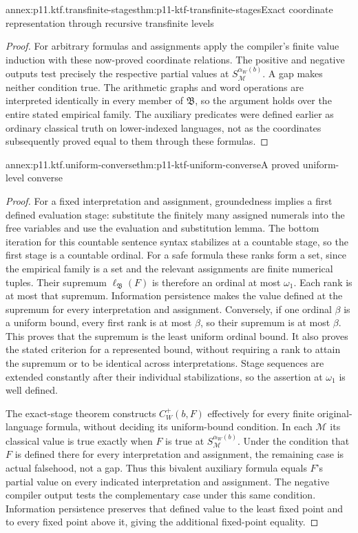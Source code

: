 \begin{annexitem}{annex:p11.ktf.transfinite-stages}{thm:p11-ktf-transfinite-stages}{Exact coordinate representation through recursive transfinite levels}
\begin{proof}
For arbitrary formulas and assignments apply the compiler's finite
value induction with these now-proved coordinate relations. The
positive and negative outputs test precisely the respective partial
values at \(S_{\mathcal M}^{\alpha_W(b)}\). A gap makes
neither condition true. The arithmetic graphs and word operations
are interpreted identically in every member of \(\mathfrak B\),
so the argument holds over the entire stated empirical family.
The auxiliary predicates were defined earlier as ordinary classical
truth on lower-indexed languages, not as the coordinates subsequently
proved equal to them through these formulas.
\end{proof}
\end{annexitem}

\begin{annexitem}{annex:p11.ktf.uniform-converse}{thm:p11-ktf-uniform-converse}{A proved uniform-level converse}
\begin{proof}
For a fixed interpretation and assignment, groundedness implies a
first defined evaluation stage: substitute the finitely many assigned
numerals into the free variables and use the evaluation and substitution
lemma. The bottom iteration for this countable sentence syntax stabilizes
at a countable stage, so the first stage is a countable ordinal.
For a safe formula these ranks form a set, since the empirical family
is a set and the relevant assignments are finite numerical tuples.
Their supremum \(\ell_{\mathfrak B}(F)\) is therefore an ordinal
at most \(\omega_1\). Each rank is at most that supremum.
Information persistence makes the value defined at the supremum for
every interpretation and assignment. Conversely, if one ordinal
\(\beta\) is a uniform bound, every first rank is at most
\(\beta\), so their supremum is at most \(\beta\).
This proves that the supremum is the least uniform ordinal bound.
It also proves the stated criterion for a represented bound, without
requiring a rank to attain the supremum or to be identical across
interpretations. Stage sequences are extended constantly after their
individual stabilizations, so the assertion at \(\omega_1\)
is well defined.

The exact-stage theorem constructs \(C_W^+(b,F)\) effectively
for every finite original-language formula, without deciding its
uniform-bound condition. In each \(\mathcal M\) its classical
value is true exactly when \(F\) is true at
\(S_{\mathcal M}^{\alpha_W(b)}\). Under the condition
that \(F\) is defined there for every interpretation and
assignment, the remaining case is actual falsehood, not a gap.
Thus this bivalent auxiliary formula equals \(F\)'s partial
value on every indicated interpretation and assignment. The negative
compiler output tests the complementary case under this same
condition. Information persistence preserves that defined value
to the least fixed point and to every fixed point above it,
giving the additional fixed-point equality.


\end{proof}
\end{annexitem}
